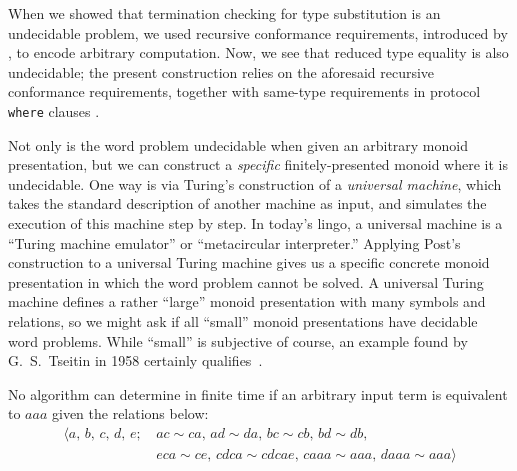\documentclass[../generics]{subfiles}
\begin{document}
When we showed that termination checking for type substitution is an undecidable problem, we used recursive conformance requirements, introduced by \cite{se0157}, to encode arbitrary computation. Now, we see that reduced type equality is also undecidable; the present construction relies on the aforesaid recursive conformance requirements, together with same-type requirements in protocol \texttt{where} clauses \cite{se0142}.

Not only is the word problem undecidable when given an arbitrary monoid presentation, but we can construct a \emph{specific} finitely-presented monoid where it is undecidable. One way is via Turing's construction of a \emph{universal machine}, which takes the standard description of another machine as input, and simulates the execution of this machine step by step. In today's lingo, a universal machine is a ``Turing machine emulator'' or ``metacircular interpreter.'' Applying Post's construction to a universal Turing machine gives us a specific concrete monoid presentation in which the word problem cannot be solved. A universal Turing machine defines a rather ``large'' monoid presentation with many symbols and relations, so we might ask if all ``small'' monoid presentations have decidable word problems. While ``small'' is subjective of course, an example found by G.~S.~Tseitin in 1958 certainly qualifies~\cite{undecidablesemigroup}.
\begin{theorem}\label{undecidablemonoid}
No algorithm can determine in finite time if an arbitrary input term is equivalent to $aaa$ given the relations below:
\begin{align*}
\langle a,\,b,\,c,\,d,\,e;\,&ac\sim ca,\,ad\sim da,\,bc\sim cb,\,bd\sim db,\\
&eca\sim ce,\,cdca\sim cdcae,\,caaa\sim aaa,\,daaa\sim aaa\rangle
\end{align*}
\end{theorem}
\end{document}
